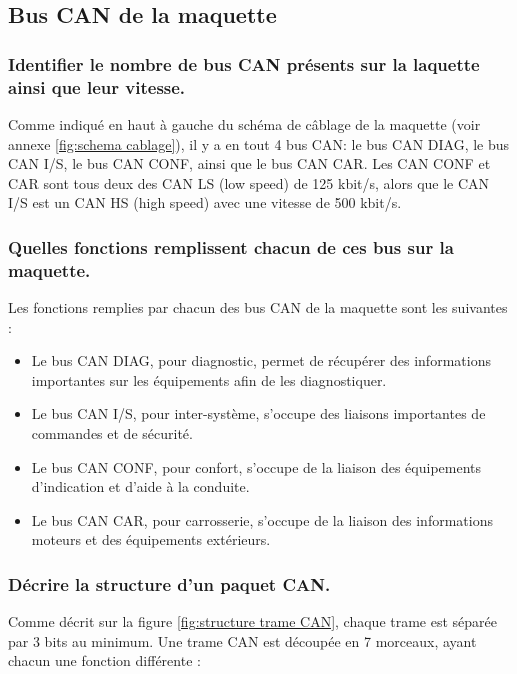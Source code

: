 \documentclass{rapportECC}
\begin{document}
\subsection{Bus CAN de la maquette}

\subsubsection*{Identifier le nombre de bus CAN présents sur la laquette ainsi que leur vitesse.}

Comme indiqué en haut à gauche du schéma de câblage de la maquette (voir annexe \ref{fig:schema cablage}), il y a en tout 4 bus CAN: le bus CAN DIAG, le bus CAN I/S, le bus CAN CONF, ainsi que le bus CAN CAR. Les CAN CONF et CAR sont tous deux des CAN LS (low speed) de 125 kbit/s, alors que le CAN I/S est un CAN HS (high speed) avec une vitesse de 500 kbit/s.

\subsubsection*{Quelles fonctions remplissent chacun de ces bus sur la maquette.}

Les fonctions remplies par chacun des bus CAN de la maquette sont les suivantes :

\begin{itemize}
    \item Le bus CAN DIAG, pour diagnostic, permet de récupérer des informations importantes sur les équipements afin de les diagnostiquer.
    \item Le bus CAN I/S, pour inter-système, s'occupe des liaisons importantes de commandes et de sécurité.
    \item Le bus CAN CONF, pour confort, s'occupe de la liaison des équipements d'indication et d'aide à la conduite.
    \item Le bus CAN CAR, pour carrosserie, s'occupe de la liaison des informations moteurs et des équipements extérieurs.
\end{itemize}

\subsubsection*{Décrire la structure d'un paquet CAN.}

Comme décrit sur la figure \ref{fig:structure trame CAN}, chaque trame est séparée par 3 bits au minimum. Une trame CAN est découpée en 7 morceaux, ayant chacun une fonction différente :
\end{document}
